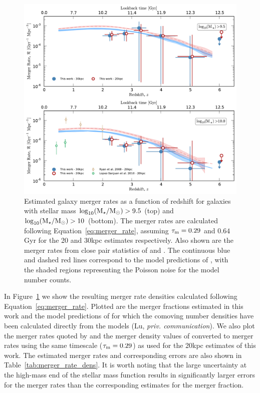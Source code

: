 \begin{figure}
\centering
	\includegraphics[width=\columnwidth]{plots/merger_rate.pdf}
  \caption[Estimated galaxy merger rates as a function of redshift.]{Estimated galaxy merger rates as a function of redshift for galaxies with stellar mass $\log_{10}(\text{M}_{\star} / \text{M}_{\odot}) > 9.5$ (top) and $\log_{10}(\text{M}_{\star} / \text{M}_{\odot}) > 10$ (bottom). The merger rates are calculated following Equation~\ref{eq:merger_rate}, assuming $\tau_{\rm{m}} = 0.29$ and $0.64$ Gyr for the 20 and 30kpc estimates respectively.   Also shown are the merger rates from close pair statistics of \citet{RyanJr:2008ka} and \citet{LopezSanjuan:2010cz}. The continuous blue and dashed red lines correspond to the model predictions of \citet{Lu:2011hj,Lu:2014kl}, with the shaded regions representing the Poisson noise for the model number counts.}
  \label{merger-fig:merger_rate}
\end{figure}

In Figure~\ref{merger-fig:merger_rate} we show the resulting merger rate densities calculated following Equation~\ref{eq:merger_rate}. Plotted are the merger fractions estimated in this work and the model predictions of \citet{Lu:2011hj} for which the comoving number densities have been calculated directly from the models (Lu, \emph{priv. communication}). We also plot the merger rates quoted by \citet{LopezSanjuan:2010cz} and the merger density values of \citet{RyanJr:2008ka} converted to merger rates using the same timescale ($\tau_{\rm{m}} = 0.29$) as used for the 20kpc estimates of this work. The estimated merger rates and corresponding errors are also shown in Table~\ref{tab:merger_rate_dens}. It is worth noting that the large uncertainty at the high-mass end of the stellar mass function results in significantly larger errors for the merger rates than the corresponding estimates for the merger fraction.

